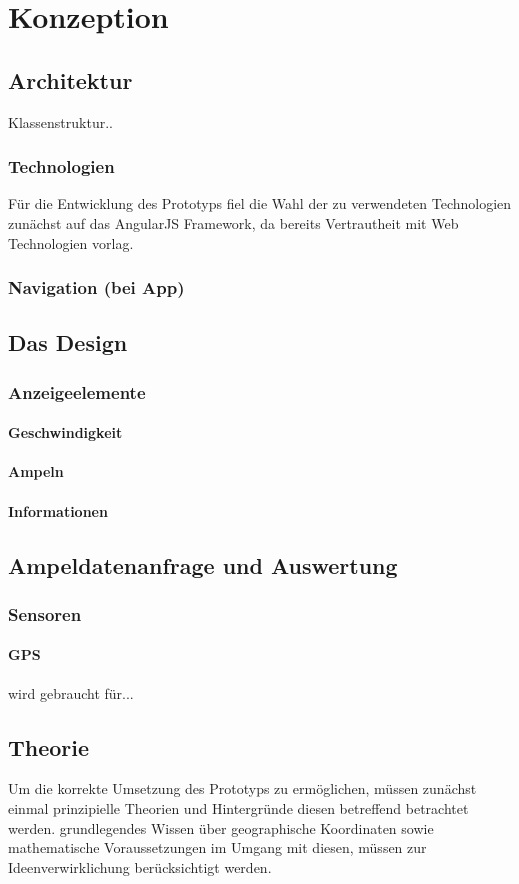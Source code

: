 \chapter{\label{chap:entwurf}Konzeption}
\section{Architektur}
Klassenstruktur..
\subsection{Technologien}
Für die Entwicklung des Prototyps fiel die Wahl der zu verwendeten Technologien zunächst auf
das AngularJS Framework, da bereits Vertrautheit mit Web Technologien vorlag.
\subsection{Navigation (bei App)}
\section{Das Design}
\subsection{Anzeigeelemente}
\subsubsection{Geschwindigkeit}
\subsubsection{Ampeln}
\subsubsection{Informationen}
\section{Ampeldatenanfrage und Auswertung}
\subsection{Sensoren}
\subsubsection{GPS} wird gebraucht für...
\section{Theorie}
Um die korrekte Umsetzung des Prototyps zu ermöglichen, müssen zunächst einmal prinzipielle
Theorien und Hintergründe diesen betreffend betrachtet werden.
grundlegendes Wissen über geographische Koordinaten sowie mathematische Voraussetzungen im Umgang mit diesen, müssen zur Ideenverwirklichung berücksichtigt werden.
